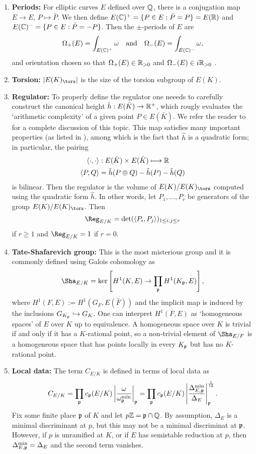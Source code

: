 \begin{enumerate}
    \item \textbf{Periods: } For elliptic curves $E$ defined over $\mathbb{Q}$, there is a conjugation map $E\to E$, $P\mapsto\bar{P}$. We then define $E(\mathbb{C})^+=\{P\in E:\bar{P}=P\}=E(\mathbb{R})$ and $E(\mathbb{C})^-=\{P\in E:\bar{P}=-P\}$. Then the $\pm$-periods of $E$ are 
    $$\Omega_+(E)=\int_{E(\mathbb{C})^+}\omega \quad\text{and}\quad\Omega_-(E)=\int_{E(\mathbb{C})^-}\omega,$$
    and orientation chosen so that $\Omega_+(E)\in\mathbb{R}_{>0}$ and $\Omega_-(E)\in i\mathbb{R}_{>0}$ .
    \item \textbf{Torsion:} $|E(K)_{\tors}|$ is the size of the torsion subgroup of $E(K)$.
    \item \textbf{Regulator:} To properly define the regulator one neeeds to carefully construct the canonical height $\hat{h}:E(\bar{K})\rightarrow\mathbb{R}^+$, which rougly evaluates the `arithmetic complexity' of a given point $P\in E(\bar{K})$. We refer the reader to \cite[Chapter VIII: \S4, \S5, \S6 and \S9]{S1} for a complete discussion of this topic. This map satisfies many important properties (as listed in \cite[Chapter VIII, Theorem 9.3]{S1}), among which is the fact that $\hat{h}$ is a quadratic form; in particular, the pairing
    \begin{align*}
        \langle\cdot,\cdot\rangle&:E(\bar{K})\times E(\bar{K})\longmapsto\mathbb{R}\\
        \langle P,Q\rangle&=\hat{h}(P\oplus Q)-\hat{h}(P)-\hat{h}(Q)
    \end{align*}
    is bilinear. Then the regulator is the volume of $E(K)/E(K)_{\tors}$ computed using the quadratic form $\hat{h}$. In other words, let $P_1,\ldots,P_r$ be generators of the group $E(K)/E(K)_{\tors}$. Then $$\Reg_{E/K}=\det(\langle P_i,P_j\rangle)_{1\leq i,j\leq r}$$
    if $r\geq1$ and $\Reg_{E/K}=1$ if $r=0$.
    \item \textbf{Tate-Shafarevich group:} This is the most misterious group and it is commonly defined using Galois cohomology as
    $$\Sha_{E/K}=\ker\left[H^1(K,E)\rightarrow\prod_{\pp}H^1(K_\pp,E)\right],$$
    where $H^1(F,E):=H^1(G_F,E(\bar{F}))$ and the implicit map is induced by the inclusions $G_{K_{\mathfrak{p}}}\hookrightarrow G_K$. One can interpret $H^1(F,E)$ as `homogeneous spaces' of $E$ over $K$ up to equivalence. A homogeneous space over $K$ is trivial if and only if it has a $K$-rational point, so a non-trivial element of $\Sha_{E/F}$ is a homogeneous space that has points locally in every $K_{\mathfrak{p}}$ but has no $K$-rational point.
    \item \textbf{Local data:} The term $C_{E/K}$ is defined in terms of local data as 
    \begin{equation*}\label{fudge-factor}
     C_{E/K}=\prod_{\mathfrak{p}}c_{\mathfrak{p}}(E/K)\left|\frac{\omega}{\omega_{\mathfrak{p}}^{\min}}\right|_{\mathfrak{p}}=\prod_{\mathfrak{p}}c_{\mathfrak{p}}(E/K)\left|\frac{\Delta_{E,\mathfrak{p}}^{\min}}{\Delta_E}\right|_{\mathfrak{p}}^{\frac{1}{12}}.   
    \end{equation*}
    Fix some finite place $\mathfrak{p}$ of $K$ and let $p\mathbb{Z}=\mathfrak{p}\cap\mathbb{Q}$. By assumption, $\Delta_E$ is a minimal discriminant at $p$, but this may not be a minimal discriminat at $\mathfrak{p}$. However, if $p$ is unramified at $K$, or if $E$ has semistable reduction at $p$, then $\Delta_{E,\mathfrak{p}}^{\min}=\Delta_E$ and the second term vanishes.


\end{enumerate}
